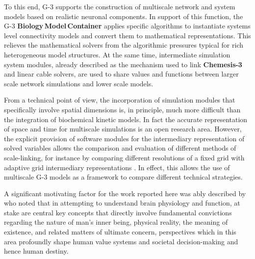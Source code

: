 \documentclass[11pt,3p,twocolumn]{JMN}
\begin{document}


To this end, G-3 supports the construction of multiscale network and system models based on realistic neuronal components.  In support of
this function, the G-3 {\bf Biology\,Model\,Container} applies specific algorithms to instantiate systems level connectivity models and convert them to mathematical representations. This relieves the mathematical solvers from the algorithmic pressures typical for rich heterogeneous model structures.  At the same time, intermediate simulation system modules, already described as the mechanism used to link {\bf Chemesis-3} and linear cable solvers, are used to share values and functions between larger scale network simulations and lower scale models.

From a technical point of view, the incorporation of simulation modules that specifically involve spatial dimensions is, in principle, much more difficult than the integration of biochemical kinetic models. In fact the accurate representation of space and time for multiscale simulations is an open research area.  However, the explicit provision of software modules for the intermediary representation of solved variables allows the comparison and evaluation of different methods of scale-linking, for instance by comparing different resolutions of a fixed grid with adaptive grid intermediary
representations \cite{MO:2009bh}. In effect, this allows the use of multiscale G-3 models as a framework to compare different technical strategies.

A significant motivating factor for the work reported here was ably described by~\citet{sperry80} who noted that in attempting to understand brain physiology and function, at stake are central key concepts that directly involve fundamental convictions regarding the nature of man's inner being, physical reality, the meaning of existence, and related matters of ultimate concern, perspectives which in this area profoundly shape human value systems and societal decision-making and hence human destiny.
\end{document}
